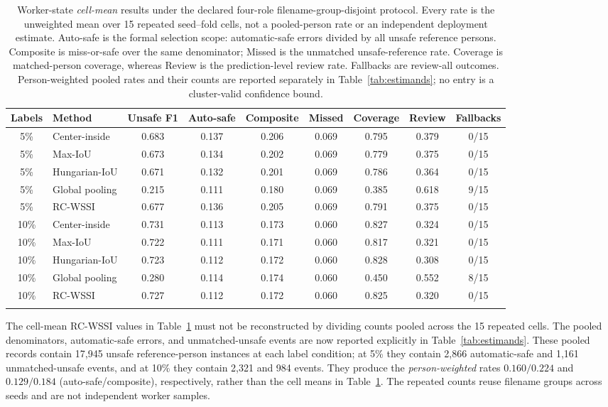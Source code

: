 \documentclass[iicol,pdflatex,sn-mathphys-num]{sn-jnl}
\begin{document}
\begin{table}[t]
\caption{Worker-state \emph{cell-mean} results under the declared four-role filename-group-disjoint protocol. Every rate is the unweighted mean over 15 repeated seed--fold cells, not a pooled-person rate or an independent deployment estimate. Auto-safe is the formal selection scope: automatic-safe errors divided by all unsafe reference persons. Composite is miss-or-safe over the same denominator; Missed is the unmatched unsafe-reference rate. Coverage is matched-person coverage, whereas Review is the prediction-level review rate. Fallbacks are review-all outcomes. Person-weighted pooled rates and their counts are reported separately in Table~\ref{tab:estimands}; no entry is a cluster-valid confidence bound.}
\label{tab:main}
\centering
\scriptsize
\setlength{\tabcolsep}{2.5pt}
\begin{tabular}{@{}c l c c c c c c c@{}}
\toprule
Labels & Method & Unsafe F1 & Auto-safe & Composite & Missed & Coverage & Review & Fallbacks \\
\midrule
5\% & Center-inside & 0.683 & 0.137 & 0.206 & 0.069 & 0.795 & 0.379 & 0/15 \\
5\% & Max-IoU & 0.673 & 0.134 & 0.202 & 0.069 & 0.779 & 0.375 & 0/15 \\
5\% & Hungarian-IoU & 0.671 & 0.132 & 0.201 & 0.069 & 0.786 & 0.364 & 0/15 \\
5\% & Global pooling & 0.215 & 0.111 & 0.180 & 0.069 & 0.385 & 0.618 & 9/15 \\
5\% & RC-WSSI & 0.677 & 0.136 & 0.205 & 0.069 & 0.791 & 0.375 & 0/15 \\
\midrule
10\% & Center-inside & 0.731 & 0.113 & 0.173 & 0.060 & 0.827 & 0.324 & 0/15 \\
10\% & Max-IoU & 0.722 & 0.111 & 0.171 & 0.060 & 0.817 & 0.321 & 0/15 \\
10\% & Hungarian-IoU & 0.723 & 0.112 & 0.172 & 0.060 & 0.828 & 0.308 & 0/15 \\
10\% & Global pooling & 0.280 & 0.114 & 0.174 & 0.060 & 0.450 & 0.552 & 8/15 \\
10\% & RC-WSSI & 0.727 & 0.112 & 0.172 & 0.060 & 0.825 & 0.320 & 0/15 \\
\botrule
\end{tabular}
\end{table}

The cell-mean RC-WSSI values in Table~\ref{tab:main} must not be reconstructed by dividing counts pooled across the 15 repeated cells. The pooled denominators, automatic-safe errors, and unmatched-unsafe events are now reported explicitly in Table~\ref{tab:estimands}. These pooled records contain 17,945 unsafe reference-person instances at each label condition; at 5\% they contain 2,866 automatic-safe and 1,161 unmatched-unsafe events, and at 10\% they contain 2,321 and 984 events. They produce the \emph{person-weighted} rates $0.160/0.224$ and $0.129/0.184$ (auto-safe/composite), respectively, rather than the cell means in Table~\ref{tab:main}. The repeated counts reuse filename groups across seeds and are not independent worker samples.
\end{document}
